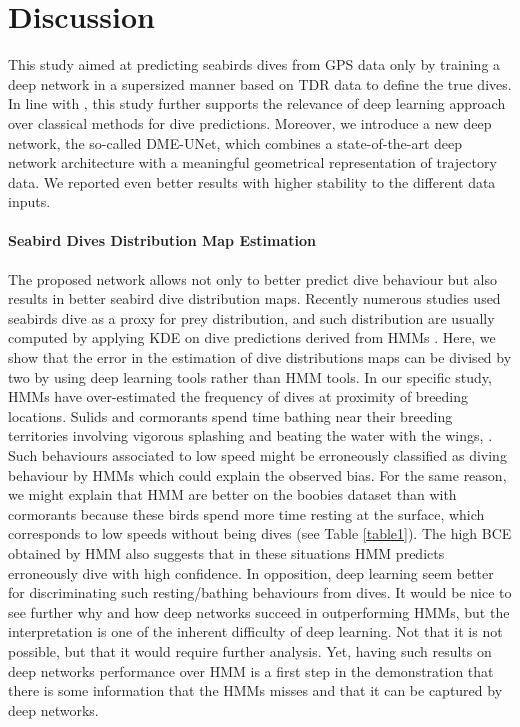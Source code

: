 \documentclass{article}
\begin{document}
\section{Discussion}
This study aimed at predicting seabirds dives from GPS data only by training a deep network in a supersized manner based on TDR data to define the true dives.
In line with \citep{browning_predicting_2018}, this study further  supports the relevance of deep learning approach over classical methods for dive predictions.
Moreover, we introduce a new deep network, the so-called DME-UNet, which combines a state-of-the-art deep network architecture with a meaningful geometrical representation of trajectory data. We reported even better results with higher stability to the different data inputs.

\paragraph{Seabird Dives Distribution Map Estimation}
The proposed network allows not only to better predict dive behaviour but also results in better seabird dive distribution maps. Recently numerous studies used seabirds dive as a proxy for prey distribution, and such distribution are usually computed by applying KDE on dive predictions derived from HMMs \citep{delord_movements_2020,weimerskirch_at-sea_2020,zhang_gps_2019}.
Here, we show that the error in the estimation of dive distributions maps can be divised by two by using deep learning tools rather than HMM tools.
In our specific study, HMMs have over-estimated the frequency of dives at proximity of breeding locations. Sulids and cormorants  spend  time  bathing  near their breeding territories involving vigorous splashing and beating the water with the wings, \citep{nelson_pelicans_2005}. Such behaviours associated to low speed might be erroneously classified as diving behaviour by HMMs which could explain the observed bias. For the same reason, we might explain that HMM are better on the boobies dataset than with cormorants because these birds spend more time resting at the surface, which corresponds to low speeds without being dives (see Table \ref{table1}). The high BCE obtained by HMM also suggests that in these situations HMM predicts erroneously dive with high confidence.
In opposition, deep learning seem better for discriminating such resting/bathing behaviours from dives. It would be nice to see further why and how deep networks succeed in outperforming HMMs, but the interpretation is one of the inherent difficulty  of deep learning. Not that it is not possible, but that it would require further analysis. Yet, having such results on deep networks performance over HMM is a first step in the demonstration that there is some information that the HMMs misses and that it can be captured by deep networks.
\end{document}
